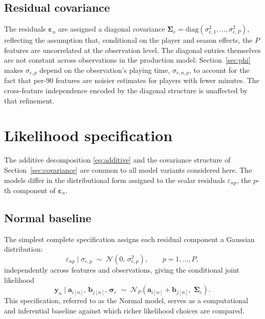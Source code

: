 \subsection{Residual covariance}

The residuals $\boldsymbol{\varepsilon}_n$ are assigned a diagonal covariance $\boldsymbol{\Sigma}_e = \mathrm{diag}(\sigma_{e,1}^2, \ldots, \sigma_{e,P}^2)$, reflecting the assumption that, conditional on the player and season effects, the $P$ features are uncorrelated at the observation level. The diagonal entries themselves are not constant across observations in the production model: Section~\ref{sec:phi} makes $\sigma_{e,p}$ depend on the observation's playing time, $\sigma_{e,n,p}$, to account for the fact that per-90 features are noisier estimates for players with fewer minutes. The cross-feature independence encoded by the diagonal structure is unaffected by that refinement.

\section{Likelihood specification}
\label{sec:likelihood}

The additive decomposition \eqref{eq:additive} and the covariance structure of Section~\ref{sec:covariance} are common to all model variants considered here. The models differ in the distributional form assigned to the scalar residuals $\varepsilon_{np}$, the $p$-th component of $\boldsymbol{\varepsilon}_n$.

\subsection{Normal baseline}

The simplest complete specification assigns each residual component a Gaussian distribution:
\begin{equation}
\varepsilon_{np} \mid \sigma_{e,p} \;\sim\; \mathcal{N}(0,\, \sigma_{e,p}^2), \qquad p = 1, \ldots, P,
\label{eq:normal_resid}
\end{equation}
independently across features and observations, giving the conditional joint likelihood
\begin{equation}
\mathbf{y}_n \mid \mathbf{a}_{i[n]},\, \mathbf{b}_{j[n]},\, \boldsymbol{\sigma}_e \;\sim\; \mathcal{N}_P\!\left(\mathbf{a}_{i[n]} + \mathbf{b}_{j[n]},\; \boldsymbol{\Sigma}_e\right).
\label{eq:normal_likelihood}
\end{equation}
This specification, referred to as the Normal model, serves as a computational and inferential baseline against which richer likelihood choices are compared.

